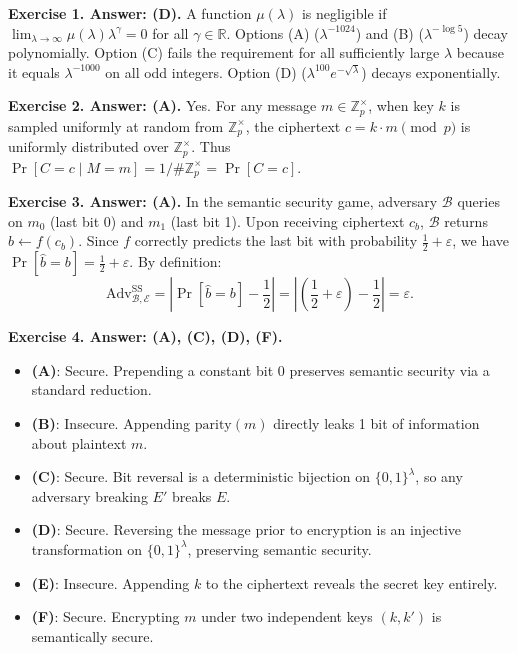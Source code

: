 \documentclass[../../book]{subfiles}
\begin{document}
\textbf{Exercise 1. Answer: (D).} A function $\mu(\lambda)$ is negligible if $\lim_{\lambda \to \infty}\mu(\lambda)\lambda^{\gamma}=0$ for all $\gamma \in \mathbb{R}$. Options (A) ($\lambda^{-1024}$) and (B) ($\lambda^{-\log 5}$) decay polynomially. Option (C) fails the requirement for all sufficiently large $\lambda$ because it equals $\lambda^{-1000}$ on all odd integers. Option (D) ($\lambda^{100}e^{-\sqrt{\lambda}}$) decays exponentially.

\textbf{Exercise 2. Answer: (A).} Yes. For any message $m \in \mathbb{Z}_p^\times$, when key $k$ is sampled uniformly at random from $\mathbb{Z}_p^\times$, the ciphertext $c = k \cdot m \pmod p$ is uniformly distributed over $\mathbb{Z}_p^\times$. Thus $\Pr[C = c \mid M = m] = 1/\#\mathbb{Z}_p^{\times} = \Pr[C = c]$.

\textbf{Exercise 3. Answer: (A).} In the semantic security game, adversary $\mathcal{B}$ queries on $m_0$ (last bit 0) and $m_1$ (last bit 1). Upon receiving ciphertext $c_b$, $\mathcal{B}$ returns $\widehat{b} \gets f(c_b)$. Since $f$ correctly predicts the last bit with probability $\frac{1}{2}+\varepsilon$, we have $\Pr[\widehat{b} = b] = \frac{1}{2}+\varepsilon$. By definition:
\begin{equation*}
    \text{Adv}^{\text{SS}}_{\mathcal{B},\mathcal{E}} = \left| \Pr[\widehat{b} = b] - \frac{1}{2} \right| = \left| \left(\frac{1}{2}+\varepsilon\right) - \frac{1}{2} \right| = \varepsilon.
\end{equation*}

\textbf{Exercise 4. Answer: (A), (C), (D), (F).}
\begin{itemize}
    \item \textbf{(A)}: Secure. Prepending a constant bit $0$ preserves semantic security via a standard reduction.
    \item \textbf{(B)}: Insecure. Appending $\text{parity}(m)$ directly leaks 1 bit of information about plaintext $m$.
    \item \textbf{(C)}: Secure. Bit reversal is a deterministic bijection on $\{0,1\}^\lambda$, so any adversary breaking $E'$ breaks $E$.
    \item \textbf{(D)}: Secure. Reversing the message prior to encryption is an injective transformation on $\{0,1\}^\lambda$, preserving semantic security.
    \item \textbf{(E)}: Insecure. Appending $k$ to the ciphertext reveals the secret key entirely.
    \item \textbf{(F)}: Secure. Encrypting $m$ under two independent keys $(k, k')$ is semantically secure.
\end{itemize}
\end{document}
